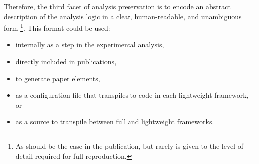 \documentclass[11pt]{article}
\begin{document}
Therefore, the third facet of \gls{analysis preservation} is to encode an abstract description of the analysis logic in a clear, human-readable, and unambiguous form%
\footnote{As should be the case in the publication, but rarely is given to the level of detail required for full reproduction.}.
This format could be used:
\begin{itemize}
    \item internally as a step in the experimental analysis, 
    \item directly included in publications,
    \item to generate paper elements,
    \item as a configuration file that transpiles to code in each lightweight framework, or
    \item as a source to transpile between full and lightweight frameworks.
\end{itemize}




\end{document}
